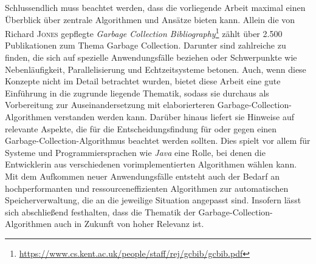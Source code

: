 Schlussendlich muss beachtet werden, dass die vorliegende Arbeit maximal einen Überblick über zentrale Algorithmen und Ansätze bieten kann.
Allein die von Richard \textsc{Jones} gepflegte \textit{Garbage Collection Bibliography}\footnote{\url{https://www.cs.kent.ac.uk/people/staff/rej/gcbib/gcbib.pdf}} zählt über 2.500 Publikationen zum Thema Garbage Collection.
Darunter sind zahlreiche zu finden, die sich auf spezielle Anwendungsfälle beziehen oder Schwerpunkte wie Nebenläufigkeit, Parallelisierung und Echtzeitsysteme betonen.
Auch, wenn diese Konzepte nicht im Detail betrachtet wurden, bietet diese Arbeit eine gute Einführung in die zugrunde liegende Thematik, sodass sie durchaus als Vorbereitung zur Auseinandersetzung mit elaborierteren Garbage-Collection-Algorithmen verstanden werden kann.
Darüber hinaus liefert sie Hinweise auf relevante Aspekte, die für die Entscheidungsfindung für oder gegen einen Garbage-Collection-Algorithmus beachtet werden sollten.
Dies spielt vor allem für Systeme und Programmiersprachen wie \textit{Java} eine Rolle, bei denen die Entwicklerin aus verschiedenen vorimplementierten Algorithmen wählen kann.
Mit dem Aufkommen neuer Anwendungsfälle entsteht auch der Bedarf an hochperformanten und ressourceneffizienten Algorithmen zur automatischen Speicherverwaltung, die an die jeweilige Situation angepasst sind.
Insofern lässt sich abschließend festhalten, dass die Thematik der Garbage-Collection-Algorithmen auch in Zukunft von hoher Relevanz ist.
